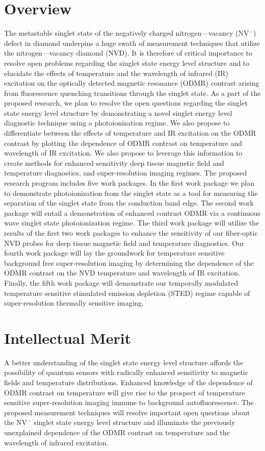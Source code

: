 \section{Overview}
The metastable singlet state of the negatively charged nitrogen—vacancy (NV$^-$) defect in diamond underpins a huge swath of measurement techniques that utilize the nitrogen—vacancy diamond (NVD).  It is therefore of critical importance to resolve open problems regarding the singlet state energy level structure and to elucidate the effects of temperature and the wavelength of infrared (IR) excitation on the optically detected magnetic resonance (ODMR) contrast arising from fluorescence quenching transitions through the singlet state.  As a part of the proposed research, we plan to resolve the open questions regarding the singlet state energy level structure by demonstrating a novel singlet energy level diagnostic technique using a photoionization regime.  We also propose to differentiate between the effects of temperature and IR excitation on the ODMR contrast by plotting the dependence of ODMR contrast on temperature and wavelength of IR excitation.  We also propose to leverage this information to create methods for enhanced sensitivity deep tissue magnetic field and temperature diagnostics, and super-resolution imaging regimes.  The proposed research program includes five work packages.  In the first work package we plan to demonstrate photoionization from the singlet state as a tool for measuring the separation of the singlet state from the conduction band edge.  The second work package will entail a demonstration of enhanced contrast ODMR via a continuous wave singlet state photoionization regime.  The third work package will utilize the results of the first two work packages to enhance the sensitivity of our fiber-optic NVD probes for deep tissue magnetic field and temperature diagnostics.  Our fourth work package will lay the groundwork for temperature sensitive background free super-resolution imaging by determining the dependence of the ODMR contrast on the NVD temperature and wavelength of IR excitation.  Finally, the fifth work package will demonstrate our temporally modulated temperature sensitive stimulated emission depletion (STED) regime capable of super-resolution thermally sensitive imaging.

\section{Intellectual Merit}
A better understanding of the singlet state energy level structure affords the possibility of quantum sensors with radically enhanced sensitivity to magnetic fields and temperature distributions.  Enhanced knowledge of the dependence of ODMR contrast on temperature will give rise to the prospect of temperature sensitive super-resolution imaging immune to background autofluorescence.  The proposed measurement techniques will resolve important open questions about the NV$^-$ singlet state energy level structure and illuminate the previously unexplained dependence of the ODMR contrast on temperature and the wavelength of infrared excitation.